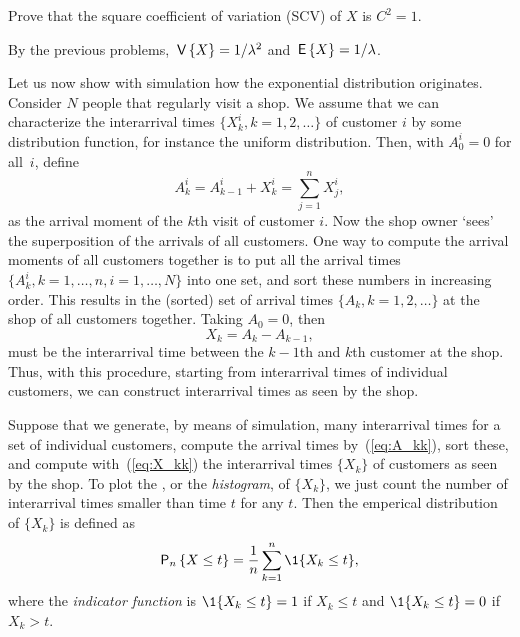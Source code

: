 \begin{exercise}
  Prove that the square coefficient of variation (SCV) of $X$ is $C^2 =1$.  
\begin{solution}
  By the previous problems, $\,\mathsf{V}\left\{X\right\} = 1/\lambda^2$ and $\,\mathsf{E}\left\{X\right\}=1/\lambda$.
\end{solution}
\end{exercise}


Let us now show with simulation how the exponential distribution
originates. Consider $N$ people that regularly visit a shop. We assume
that we can characterize the interarrival times
$\{X_k^i, k=1,2, \ldots\}$ of customer $i$ by some distribution
function, for instance the uniform distribution. Then, with
$A_{0}^i=0$ for all~$i$, define 
\begin{equation}\label{eq:A_kk}
A_k^i = A_{k-1}^i + X_k^i = \sum_{j=1}^n X_j^i,
\end{equation}
as the arrival moment of the $k$th visit of customer $i$.  Now the
shop owner `sees' the superposition of the arrivals of all
customers. One way to compute the arrival moments of all customers
together is to put all the arrival times
$\{A_k^i, k=1,\ldots,n, i=1,\ldots,N\}$ into one set, and sort these
numbers in increasing order. This results in the (sorted) set of
arrival times $\{A_k, k=1,2,\ldots\}$ at the shop of all customers together. Taking $A_0=0$,  then
\begin{equation}\label{eq:X_kk}
X_k = A_k - A_{k-1},
\end{equation}
must be the interarrival time between the $k-1$th and
$k$th customer at the shop.  Thus, with this procedure, starting from interarrival times of
individual customers, we can construct interarrival times as seen by
the shop.


Suppose that we  generate, by means of simulation, many interarrival times for a set of individual customers, compute the arrival times by~(\ref{eq:A_kk}), sort these, and compute with~(\ref{eq:X_kk}) the interarrival times $\{X_k\}$ of customers as seen by the shop.  To plot the , or the \emph{histogram}, of $\{X_k\}$, we just  count the
number of interarrival times smaller than time $t$ for any $t$.  Then the emperical distribution of $\{X_k\}$ is defined as
\begin{equation*}
  \P{X \leq t}_{n} = \frac1{n}\sum_{k=1}^{n} \1{X_k\leq t},
\end{equation*}
where the \emph{indicator function} is $\1{X_k\leq t}=1$ if $X_k\leq t$ and $\1{X_k\leq t}=0$
if $X_k> t$.  

